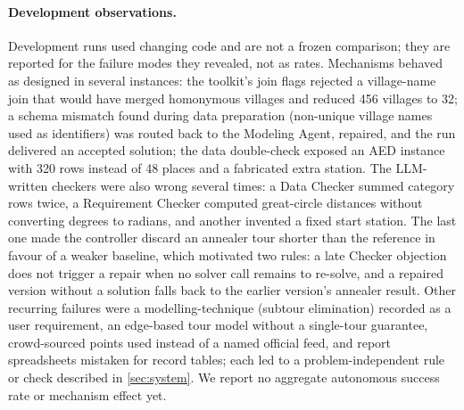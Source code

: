\paragraph{Development observations.}
Development runs used changing code and are not a frozen comparison; they are reported for the failure modes they
revealed, not as rates. Mechanisms behaved as designed in several instances: the toolkit's join flags rejected
a village-name join that would have merged homonymous villages and reduced 456 villages to 32; a schema mismatch
found during data preparation (non-unique village names used as identifiers) was routed back to the Modeling
Agent, repaired, and the run delivered an accepted solution; the data double-check exposed an AED instance with
320 rows instead of 48 places and a fabricated extra station. The LLM-written checkers were also wrong several
times: a Data Checker summed category rows twice, a Requirement Checker computed great-circle distances without
converting degrees to radians, and another invented a fixed start station. The last one made the controller
discard an annealer tour shorter than the reference in favour of a weaker baseline, which motivated two rules:
a late Checker objection does not trigger a repair when no solver call remains to re-solve, and a repaired
version without a solution falls back to the earlier version's annealer result. Other recurring failures were
a modelling-technique (subtour elimination) recorded as a user requirement, an edge-based tour model without a
single-tour guarantee, crowd-sourced points used instead of a named official feed, and report spreadsheets
mistaken for record tables; each led to a problem-independent rule or check described in \cref{sec:system}.
We report no aggregate autonomous success rate or mechanism effect yet.

